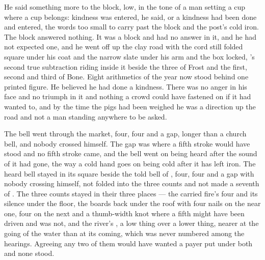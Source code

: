 He said something more to the block, low, in the tone of a man setting a cup where a cup belongs: kindness was entered, he said, or a kindness had been done and entered, the words too small to carry past the block and the post's cold iron. The block answered nothing. It was a block and had no answer in it, and he had not expected one, and he went off up the clay road with the cord still folded square under his coat and the narrow slate under his arm and the box locked, 's second true subtraction riding inside it beside the three of Frost and the first, second and third of Bone. Eight arithmetics of the year now stood behind one printed figure. He believed he had done a kindness. There was no anger in his face and no triumph in it and nothing a crowd could have fastened on if it had wanted to, and by the time the pigs had been weighed he was a direction up the road and not a man standing anywhere to be asked.

The bell went through the market, four, four and a gap, longer than a church bell, and nobody crossed himself. The gap was where a fifth stroke would have stood and no fifth stroke came, and the bell went on being heard after the sound of it had gone, the way a cold hand goes on being cold after it has left iron. The heard bell stayed in its square beside the told bell of , four, four and a gap with nobody crossing himself, not folded into the three counts and not made a seventh of . The three counts stayed in their three places --- the carried fire's four and its silence under the floor, the boards back under the roof with four nails on the near one, four on the next and a thumb-width knot where a fifth might have been driven and was not, and the river's , a low thing over a lower thing, nearer at the going of the water than at its coming, which was never numbered among the hearings. Agreeing any two of them would have wanted a payer put under both and none stood.

\scenebreak

